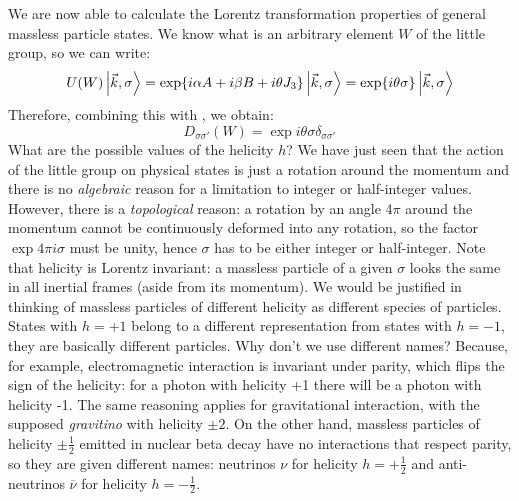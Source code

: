 \documentclass[../main.tex]{subfiles}
\begin{document}
We are now able to calculate the Lorentz transformation properties of general massless particle states. We know what is an arbitrary element  $W$ of the little group, so we can write:
\[
U(W)\ket{\vec{k},\sigma}=\exp{i\alpha A+i\beta B+i\theta J_3}\ket{\vec{k},\sigma}=\exp{i\theta\sigma}\ket{\vec{k},\sigma}
\]
Therefore, combining this with , we obtain:
\[
D_{\sigma\sigma'}(W)=\exp{i\theta\sigma}\delta_{\sigma\sigma'}
\]
What are the possible values of the helicity $h$? We have just seen that the action of the little group on physical states is just a rotation around the momentum and there is no \textit{algebraic} reason for a limitation to integer or half-integer values. However, there is a \textit{topological} reason: a rotation by an angle 4$\pi$ around the momentum cannot be continuously deformed into any rotation, so the factor $\exp{4\pi i\sigma}$ must be unity, hence $\sigma$ has to be either integer or half-integer. Note that helicity is Lorentz invariant: a massless particle of a given $\sigma$ looks the same in all inertial frames (aside from its momentum). We would be justified in thinking of massless particles of different helicity as different species of particles. States with $h=+1$ belong to a different representation from states with $h=-1$, they are basically different particles. Why don't we use different names? Because, for example, electromagnetic interaction is invariant under parity, which flips the sign of the helicity: for a photon with helicity +1 there will be a photon with helicity -1. The same reasoning applies for gravitational interaction, with the supposed \textit{gravitino} with helicity $\pm2$. On the other hand, massless particles of helicity $\pm\frac{1}{2}$ emitted in nuclear beta decay have no interactions that respect parity, so they are given different names: neutrinos $\nu$ for helicity $h=+\frac{1}{2}$ and anti-neutrinos $\overline{\nu}$ for helicity $h=-\frac{1}{2}$.\\
\end{document}
